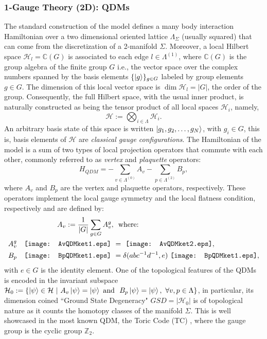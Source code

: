 \documentclass[titlepage,11pt]{article}
\theoremstyle{plain}%
\theoremstyle{definition}
\theoremstyle{remark}
\begin{document}
\subsubsection{1-Gauge Theory (2D): QDMs}\label{sec:QDMs}
 The standard construction of the model \cite{Kitaev2} defines a many body interaction Hamiltonian over a two dimensional oriented lattice $\Lambda_\Sigma$ (usually squared) that can come from the discretization of a 2-manifold $\Sigma$.  Moreover, a local Hilbert space $\mathcal{H}_l=\mathbb{C}(G)$ is associated to each edge $l\in \Lambda^{(1)}$, where $\mathbb{C}(G)$ is the group algebra of the finite group $G$ i.e., the vector space over the complex numbers spanned by the basis elements $\{\Ket{g}\}_{g \in G}$ labeled by group elements $g \in G$. The dimension of this local vector space is $\dim \mathcal{H}_l=|G|$, the order of the group. Consequently, the full Hilbert space, with the usual inner product,  is naturally constructed as being the tensor product of all local spaces $\mathcal{H}_i$, namely,
\begin{equation}\label{eq:HilbertQDM}
 \mathcal{H}:=\bigotimes_{i \in \Lambda} \mathcal{H}_i.
\end{equation}
An arbitrary basis state of this space is written $\ket{g_1,g_2, \dots, g_N}$, with $g_i \in G$, this is, basis elements of $\mathcal{H}$ are \emph{classical gauge configurations}.
The Hamiltonian of the model is a sum of two types of local projection operators that commute with each other, commonly referred to as \emph{vertex} and \emph{plaquette} operators:
\begin{equation}
H_{QDM}=-\sum_{v \in \Lambda^{(0)}} A_v - \sum
_{p \in \Lambda^{(2)}} B_p,
\end{equation}
where $A_v$ and $B_p$ are the vertex and plaquette operators, respectively. These operators implement the local gauge symmetry and the local flatness condition, respectively and are defined by:
\begin{align}
 A_v := \frac{1}{|G|}\sum_{g \in G}A_v^g, &\ \label{eq:Av1G} \  \text{where: } \\
 A_v^g \quad \vcenter{\hbox{\texttt{[image: AvQDMket1.eps]}}}\ &= \ \vcenter{\hbox{\texttt{[image: AvQDMket2.eps]}}}, \nonumber \\
 B_p \quad \vcenter{\hbox{\texttt{[image: BpQDMket1.eps]}}}\ &= \delta(abc^{-1}d^{-1},e)\ \vcenter{\hbox{\texttt{[image: BpQDMket1.eps]}}},
\end{align}
with $e\in G$ is the identity element. One of the topological features of the QDMs is encoded in the invariant subspace $\mathcal{H}_0:= \{ \ket{\psi} \in \mathcal{H}\ | \ A_v\ket{\psi} = \ket{\psi}\ \text{and }\ B_p\ket{\psi}=\ket{\psi}, \ \forall v,p \in \Lambda\}$, in particular, its dimension coined ``Ground State Degeneracy" $GSD=|\mathcal{H}_0|$ is of topological nature as it counts the homotopy classes of the manifold $\Sigma$. This is well showcased in the most known QDM, the Toric Code (TC) \cite{kitaev2}, where the gauge group is the cyclic group $\mathbb{Z}_2$.
\end{document}
